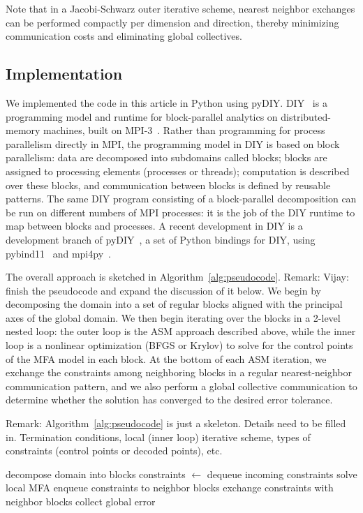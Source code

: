 \documentclass[conference]{IEEEtran}
\newcommand{\Remark}[1]{{\color{RED}\sf Remark: {#1}}}
\begin{document}
Note that in a Jacobi-Schwarz outer iterative scheme, nearest neighbor exchanges can be performed compactly per dimension and direction, thereby minimizing communication costs and eliminating global collectives.


\subsection{Implementation}

We implemented the code in this article in Python using pyDIY. DIY~\cite{morozov16} is a programming model and runtime
for block-parallel analytics on distributed-memory machines, built on MPI-3~\cite{dongarra13}.  Rather than programming
for process parallelism directly in MPI, the programming model in DIY is based on block parallelism: data are decomposed
into subdomains called blocks; blocks are assigned to processing elements (processes or threads); computation is
described over these blocks, and communication between blocks is defined by reusable patterns. The same DIY program
consisting of a block-parallel decomposition can be run on different numbers of MPI processes: it is the job of the DIY
runtime to map between blocks and processes. A recent development in DIY is a development branch of pyDIY~\cite{pydiy},
a set of Python bindings for DIY, using pybind11~\cite{jakob17} and mpi4py~\cite{dalcin11}.

The overall approach is sketched in Algorithm~\ref{alg:pseudocode}. \Remark{Vijay: finish the pseudocode and expand the
discussion of it below.} We begin by decomposing the domain into a set of regular blocks aligned with the principal axes
of the global domain. We then begin iterating over the blocks in a 2-level nested loop: the outer loop is the ASM
approach described above, while the inner loop is a nonlinear optimization (BFGS or Krylov) to solve for the control
points of the MFA model in each block. At the bottom of each ASM iteration, we exchange the constraints
among neighboring blocks in a regular nearest-neighbor communication pattern, and we also perform a global
collective communication to determine whether the solution has converged to the desired error tolerance.

\Remark{Algorithm~\ref{alg:pseudocode} is just a skeleton. Details need to be filled in. Termination conditions, local
(inner loop) iterative scheme, types of constraints (control points or decoded points), etc.}

\begin{algorithm}
    \DontPrintSemicolon
    decompose domain into blocks\;
    \;
    {
        constraints $\leftarrow$ dequeue incoming constraints\;
        \;
        {
            solve local MFA\;
            enqueue constraints to neighbor blocks\;
        }
        exchange constraints with neighbor blocks\;
        collect global error\;
    }
    \caption{\Remark{Caption TBD}}
    \label{alg:pseudocode}
\end{algorithm}
\end{document}
